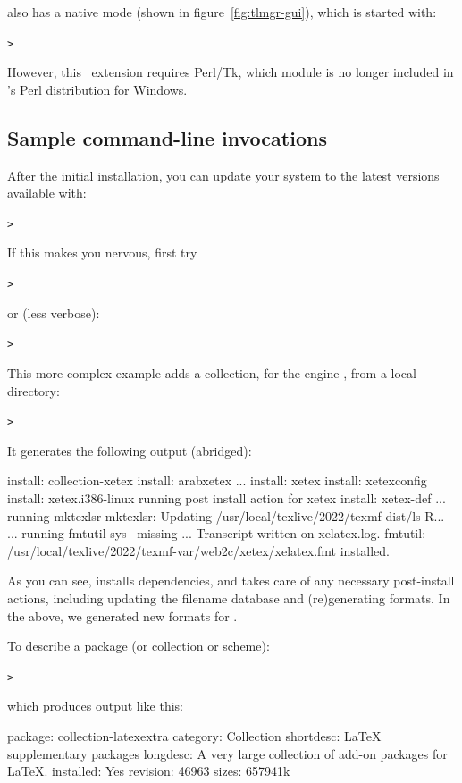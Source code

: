 \documentclass{article}
\begin{document}
 also has a native \GUI{} mode (shown in
figure~\ref{fig:tlmgr-gui}), which is started with:
\begin{alltt}
> 
\end{alltt}
However, this \GUI\ extension requires Perl/Tk, which module is no
longer included in \TL's Perl distribution for Windows.

\subsection{Sample  command-line invocations}

After the initial installation, you can update your system to the latest
versions available with:
\begin{alltt}
> 
\end{alltt}
If this makes you nervous, first try
\begin{alltt}
> 
\end{alltt}
or (less verbose):
\begin{alltt}
> 
\end{alltt}

This more complex example adds a collection, for the engine \XeTeX, from
a local directory:

\begin{alltt}
> 
\end{alltt}
It generates the following output (abridged):
\begin{fverbatim}
install: collection-xetex
install: arabxetex
...
install: xetex
install: xetexconfig
install: xetex.i386-linux
running post install action for xetex
install: xetex-def
...
running mktexlsr
mktexlsr: Updating /usr/local/texlive/2022/texmf-dist/ls-R...
...
running fmtutil-sys --missing
...
Transcript written on xelatex.log.
fmtutil: /usr/local/texlive/2022/texmf-var/web2c/xetex/xelatex.fmt installed.
\end{fverbatim}

As you can see,  installs dependencies, and takes care of any
necessary post-install actions, including updating the filename database
and (re)generating formats.  In the above, we generated new formats for
\XeTeX.

To describe a package (or collection or scheme):
\begin{alltt}
> 
\end{alltt}
which produces output like this:
\begin{fverbatim}
package:    collection-latexextra
category:   Collection
shortdesc:  LaTeX supplementary packages
longdesc:   A very large collection of add-on packages for LaTeX.
installed:  Yes
revision:   46963
sizes:      657941k
\end{fverbatim}
\end{document}
